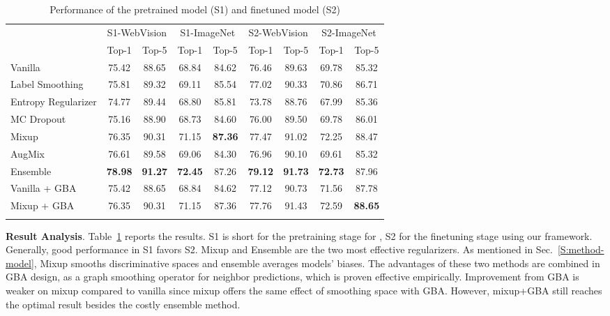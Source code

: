 \documentclass[runningheads]{llncs}
\begin{document}
\begin{table}[t]
	\caption{Performance of the pretrained model (S1) and finetuned model (S2)}
	\smallskip
	\centering
	\begin{tabular}{lcccccccc}
		\toprule
		{\multirow{2}{*}{Method}} & \multicolumn{2}{c}{S1-WebVision} & \multicolumn{2}{c}{S1-ImageNet} & \multicolumn{2}{c}{S2-WebVision} & \multicolumn{2}{c}{S2-ImageNet}\\
		\multicolumn{1}{c}{} & \multicolumn{1}{c}{Top-1} & \multicolumn{1}{c}{Top-5} & \multicolumn{1}{c}{Top-1} & \multicolumn{1}{c}{Top-5}  & \multicolumn{1}{c}{Top-1} & \multicolumn{1}{c}{Top-5} & \multicolumn{1}{c}{Top-1} & \multicolumn{1}{c}{Top-5}\\
		\midrule
		Vanilla 						& 75.42 & 88.65 & 68.84 & 84.62 & 76.46 & 89.63 & 69.78 & 85.32 \\ 
		Label Smoothing  		 & 75.81 & 89.32 & 69.11 & 85.54  & 77.02 & 90.33 & 70.86 & 86.71\\ 
		Entropy Regularizer 	& 74.77 & 89.44 & 68.80 & 85.81  & 73.78 & 88.76 & 67.99 & 85.36\\ 
		MC Dropout  & 75.16 & 88.90 & 68.73 & 84.60 & 76.00 & 89.50 & 69.78 & 86.01 \\ 
		Mixup   & 76.35 & 90.31 & 71.15 & \textbf{87.36} & 77.47 & 91.02 & 72.25 & 88.47\\
		AugMix  						& 76.61 & 89.58 & 69.06 & 84.30 & 76.96 & 90.10 & 69.61 & 85.32\\
		Ensemble  	  & \textbf{78.98} & \textbf{91.27} & \textbf{72.45} & 87.26  & \textbf{79.12} & \textbf{91.73} & \textbf{72.73} & 87.96 \\ 
		\midrule
		Vanilla + GBA			   & 75.42 & 88.65 & 68.84 & 84.62 & 77.12 & 90.73 & 71.56 & 87.78\\
		Mixup + GBA			   & 76.35 & 90.31 & 71.15 & 87.36 & 77.76 & 91.43 & 72.59 & \textbf{88.65}\\
		\bottomrule
		\noalign{\bigskip}
	\end{tabular}
	\label{tab:stage1}
\end{table}

\textbf{Result Analysis}.
Table~\ref{tab:stage1} reports the results. S1 is short for the pretraining stage for , S2 for the finetuning stage using our framework. Generally, good performance in S1 favors S2. Mixup and Ensemble are the two most effective regularizers. As mentioned in Sec.~\ref{S:method-model}, Mixup smooths discriminative spaces and ensemble averages models’ biases. The advantages of these two methods are combined in GBA design, as a graph smoothing operator for neighbor predictions, which is proven effective empirically. Improvement from GBA is weaker on mixup compared to vanilla since mixup offers the same effect of smoothing space with GBA. However, mixup+GBA still reaches the optimal result besides the costly ensemble method.
\end{document}
